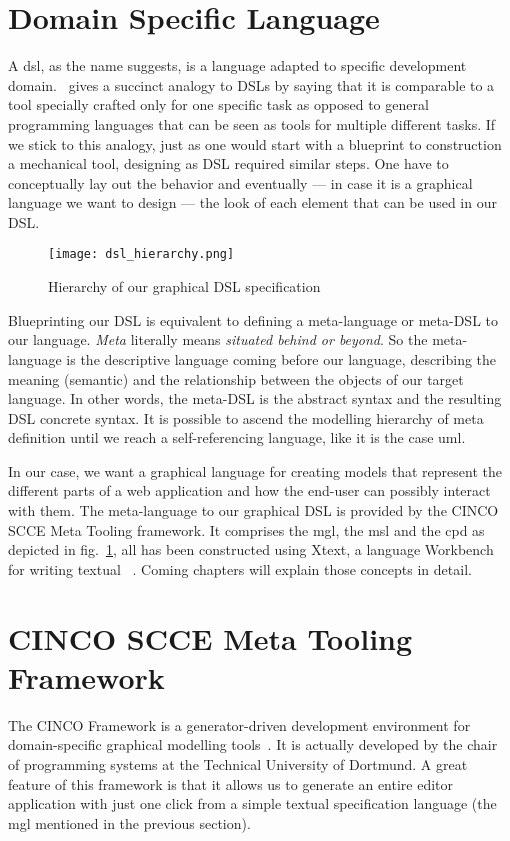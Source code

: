 \section{Domain Specific Language}

A \acrfull{dsl}, as the name suggests, is a language adapted to specific development domain.~\cite{Naujokat2018} gives a succinct analogy to DSLs by saying that it is comparable to a tool specially crafted only for one specific task as opposed to general programming languages that can be seen as tools for multiple different tasks. If we stick to this analogy, just as one would start with a blueprint to construction a mechanical tool, designing as DSL required similar steps. One have to conceptually lay out the behavior and eventually --- in case it is a graphical language we want to design --- the look of each element that can be used in our DSL. 

\begin{figure}[H]
    \texttt{[image: dsl\_hierarchy.png]}
    \caption{Hierarchy of our graphical DSL specification}\label{fig:modelling-hierachy}
\end{figure}

Blueprinting our DSL is equivalent to defining a meta-language or meta-DSL to our language. \textit{Meta} literally means \textit{situated behind or beyond}. So the meta-language is the descriptive language coming before our language, describing the meaning (semantic) and the relationship between the objects of our target language. In other words, the meta-DSL is the abstract syntax and the resulting DSL concrete syntax. It is possible to ascend the modelling hierarchy of meta definition until we reach a self-referencing language, like it is the case \acrfull{uml}.

In our case, we want a graphical language for creating models that represent the different parts of a web application and how the end-user can possibly interact with them. The meta-language to our graphical DSL is provided by the CINCO SCCE Meta Tooling framework. It comprises the \acrfull{mgl}, the \acrfull{msl} and the \acrfull{cpd} as depicted in fig.~\ref{fig:modelling-hierachy}, all has been constructed using Xtext, a language Workbench for writing textual ~\cite{naujokat-diss}. Coming chapters will explain those concepts in detail.

\section{CINCO SCCE Meta Tooling Framework}\label{sec:cincoTool}

The CINCO Framework is a generator-driven development environment for domain-specific graphical modelling tools~\cite{Cinco}. It is actually developed by the chair of programming systems at the Technical University of Dortmund. A great feature of this framework is that it allows us to generate an entire editor application with just one click from a simple textual specification language (the \acrfull{mgl} mentioned in the previous section).